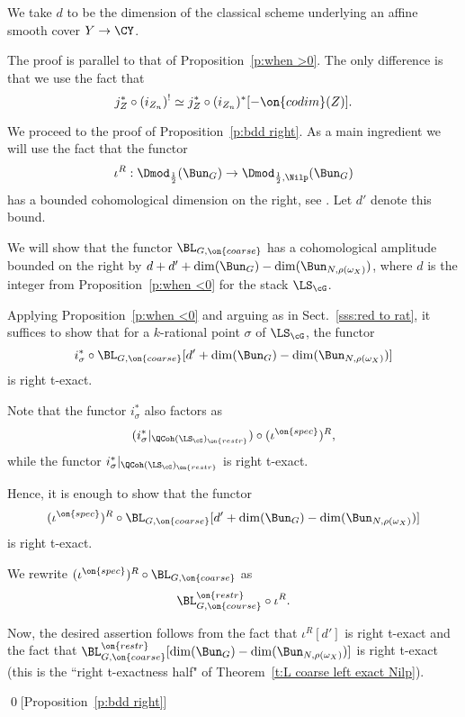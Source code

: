\documentclass[9pt]{amsart}
\theoremstyle{remark}
\theoremstyle{definition}
\theoremstyle{remark}
\newcommand{\thmref}[1]{Theorem~\ref{#1}}
\newcommand{\secref}[1]{Sect.~\ref{#1}}
\newcommand{\propref}[1]{Proposition~\ref{#1}}
\numberwithin{equation}{section}
\begin{document}
We take $d$ to be the dimension of the classical scheme
underlying an affine smooth cover $Y\to \CY$. 

\medskip 

The proof is parallel to that of \propref{p:when >0}. The only difference is that we use the fact that 
$$j_Z^*\circ (i_{Z_n})^!\simeq j_Z^*\circ (i_{Z_n})^*[-\on{codim}(Z)].$$

\sssec{}

We proceed to the proof of \propref{p:bdd right}. As a main ingredient we will use 
the fact that the functor 
$$\iota^R:  \Dmod_{\frac{1}{2}}(\Bun_G) \to \Dmod_{\frac{1}{2},\Nilp}(\Bun_G)$$
has a bounded cohomological dimension on the right, see \cite[Corollary 14.5.5 and Proposition 17.3.10]{AGKRRV}. 
Let $d'$ denote this bound. 

\medskip

We will show that the functor $\BL_{G,\on{coarse}}$ has a cohomological amplitude bounded on the right by
$d+d'+\dim(\Bun_G)-\dim(\Bun_{N,\rho(\omega_X)})$, where $d$ is the integer from \propref{p:when <0} for the stack $\LS_\cG$. 

\sssec{}

Applying \propref{p:when <0} and arguing as in \secref{sss:red to rat}, it suffices to show that for a $k$-rational
point $\sigma$ of $\LS_\cG$, the functor
$$i_\sigma^*\circ \BL_{G,\on{coarse}}[d'+\dim(\Bun_G)-\dim(\Bun_{N,\rho(\omega_X)})]$$
is right t-exact.

\medskip

Note that the functor $i_\sigma^*$ also factors as
$$(i_\sigma^*|_{\QCoh(\LS_\cG)_{\on{restr}}})\circ (\iota^{\on{spec}})^R,$$
while the functor $i_\sigma^*|_{\QCoh(\LS_\cG)_{\on{restr}}}$ is right t-exact. 

\medskip

Hence, it is enough to show that the functor
$$(\iota^{\on{spec}})^R \circ \BL_{G,\on{coarse}}[d'+\dim(\Bun_G)-\dim(\Bun_{N,\rho(\omega_X)})]$$
is right t-exact. 

\sssec{}

We rewrite $(\iota^{\on{spec}})^R \circ \BL_{G,\on{coarse}}$ as 
$$\BL_{G,\on{course}}^{\on{restr}}\circ \iota^R.$$

Now, the desired assertion follows from the fact that $\iota^R[d']$ is right t-exact and 
the fact that $\BL^{\on{restr}}_{G,\on{coarse}}[\dim(\Bun_G)-\dim(\Bun_{N,\rho(\omega_X)})]$ is right t-exact
(this is the ``right t-exactness half" of \thmref{t:L coarse left exact Nilp}). 

\qed[\propref{p:bdd right}]
\end{document}
